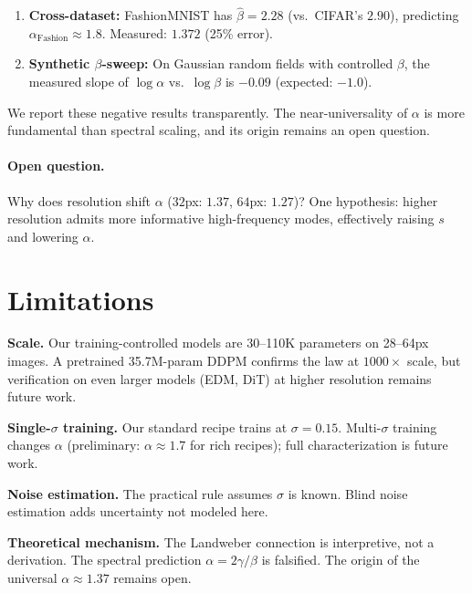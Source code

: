 \documentclass[letterpaper]{article}
\begin{document}
\begin{enumerate}[leftmargin=*,topsep=2pt,itemsep=1pt]
\item \textbf{Cross-dataset:} FashionMNIST has $\hat\beta = 2.28$
  (vs.\ CIFAR's $2.90$), predicting $\alpha_{\text{Fashion}} \approx 1.8$.
  Measured: $1.372$ (25\% error).

\item \textbf{Synthetic $\beta$-sweep:} On Gaussian random fields with
  controlled $\beta$, the measured slope of $\log\alpha$ vs.\ $\log\beta$
  is $-0.09$ (expected: $-1.0$).
\end{enumerate}

We report these negative results transparently.
The near-universality of $\alpha$ is more fundamental than
spectral scaling, and its origin remains an open question.

\paragraph{Open question.}
Why does resolution shift $\alpha$ ($32$px: $1.37$, $64$px: $1.27$)?
One hypothesis: higher resolution admits more informative high-frequency
modes, effectively raising $s$ and lowering $\alpha$.

\section{Limitations}
\label{sec:limitations}

\textbf{Scale.}
Our training-controlled models are 30--110K parameters on 28--64px images.
A pretrained 35.7M-param DDPM confirms the law at $1000\times$ scale,
but verification on even larger models (EDM, DiT) at higher resolution
remains future work.

\textbf{Single-$\sigma$ training.}
Our standard recipe trains at $\sigma = 0.15$.
Multi-$\sigma$ training changes $\alpha$ (preliminary: $\alpha \approx 1.7$
for rich recipes); full characterization is future work.

\textbf{Noise estimation.}
The practical rule assumes $\sigma$ is known.
Blind noise estimation adds uncertainty not modeled here.

\textbf{Theoretical mechanism.}
The Landweber connection is interpretive, not a derivation.
The spectral prediction $\alpha = 2\gamma/\beta$ is falsified.
The origin of the universal $\alpha \approx 1.37$ remains open.
\end{document}
